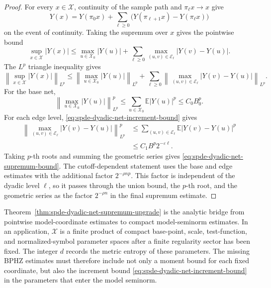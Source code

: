\begin{proof}
For every \(x\in\mathcal X\), continuity of the sample path and
\(\pi_\ell x\to x\) give
\[
  Y(x)=Y(\pi_0x)+
  \sum_{\ell\geq0}\bigl(Y(\pi_{\ell+1}x)-Y(\pi_\ell x)\bigr)
\]
on the event of continuity.  Taking the supremum over \(x\) gives the
pointwise bound
\[
  \sup_{x\in\mathcal X}|Y(x)|
  \leq
  \max_{u\in\mathcal X_0}|Y(u)|
  +
  \sum_{\ell\geq0}
  \max_{(u,v)\in\mathcal E_\ell}|Y(v)-Y(u)|.
\]
The \(L^p\) triangle inequality gives
\[
  \left\|
    \sup_{x\in\mathcal X}|Y(x)|
  \right\|_{L^p}
  \leq
  \left\|\max_{u\in\mathcal X_0}|Y(u)|\right\|_{L^p}
  +
  \sum_{\ell\geq0}
  \left\|\max_{(u,v)\in\mathcal E_\ell}|Y(v)-Y(u)|\right\|_{L^p}.
\]
For the base net,
\[
  \left\|\max_{u\in\mathcal X_0}|Y(u)|\right\|_{L^p}^p
  \leq
  \sum_{u\in\mathcal X_0}\mathbb E|Y(u)|^p
  \leq
  C_0B_0^p .
\]
For each edge level, \eqref{eq:spde-dyadic-net-increment-bound} gives
\[
\begin{aligned}
  \left\|\max_{(u,v)\in\mathcal E_\ell}|Y(v)-Y(u)|\right\|_{L^p}^p
  &\leq
  \sum_{(u,v)\in\mathcal E_\ell}\mathbb E|Y(v)-Y(u)|^p        \\
  &\leq
  C_1B^p2^{-\varepsilon\ell}.
\end{aligned}
\]
Taking \(p\)-th roots and summing the geometric series gives
\eqref{eq:spde-dyadic-net-supremum-bound}.  The cutoff-dependent statement
uses the base and edge estimates with the additional factor
\(2^{-\rho n p}\).  This factor is independent of the dyadic level \(\ell\),
so it passes through the union bound, the \(p\)-th root, and the geometric
series as the factor \(2^{-\rho n}\) in the final supremum estimate.
\end{proof}

Theorem~\ref{thm:spde-dyadic-net-supremum-upgrade} is the analytic bridge
from pointwise model-coordinate estimates to compact model-seminorm
estimates.  In an application, \(\mathcal X\) is a finite product of compact
base-point, scale, test-function, and normalized-symbol parameter spaces
after a finite regularity sector has been fixed.  The integer \(d\) records
the metric entropy of these parameters.  The missing BPHZ estimates must
therefore include not only a moment bound for each fixed coordinate, but also
the increment bound \eqref{eq:spde-dyadic-net-increment-bound} in the
parameters that enter the model seminorm.

